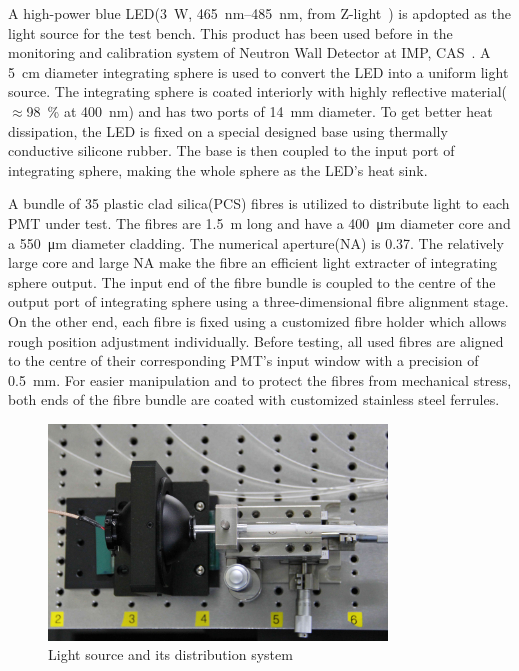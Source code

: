 \documentclass[5p, times]{elsarticle}
\begin{document}
A high-power blue LED(\SI{3}{\watt}, \SIrange{465}{485}{\nano\meter},  from Z-light~\cite{zlight}) is apdopted as the light source for the test bench.
This product has been used before in the monitoring and calibration system of Neutron Wall Detector at IMP, CAS~\cite{yuyuhong_led}. 
A \SI{5}{\centi\meter} diameter integrating sphere is used to convert the LED into a uniform light source.
The integrating sphere is coated interiorly with highly reflective material($\approx$\SI{98}{\percent} at \SI{400}{\nano\meter}) and has two ports of \SI{14}{\milli\meter} diameter.
To get better heat dissipation, the LED is fixed on a special designed base using thermally conductive silicone rubber.
The base is then coupled to the input port of integrating sphere, making the whole sphere as the LED's heat sink.

A bundle of 35 plastic clad silica(PCS) fibres is utilized to distribute light to each PMT under test.
The fibres are \SI{1.5}{\meter} long and have a \SI{400}{\micro\meter} diameter core and a \SI{550}{\micro\meter} diameter cladding.
The numerical aperture(NA) is 0.37.
The relatively large core and large NA make the fibre an efficient light extracter of integrating sphere output. 
The input end of the fibre bundle is coupled to the centre of the output port of integrating sphere using a three-dimensional fibre alignment stage.
On the other end, each fibre is fixed using a customized fibre holder which allows rough position adjustment individually.
Before testing, all used fibres are aligned to the centre of their corresponding PMT's input window with a precision of \SI{0.5}{\milli\meter}.  
For easier manipulation and to protect the fibres from mechanical stress, both ends of the fibre bundle are coated with customized stainless steel ferrules.

\begin{figure}[h!]
 \centering
 \includegraphics[width=90mm]{light_source1_crop}
\caption{Light source and its distribution system}
\label{fig:light_source}
\end{figure} 
\end{document}
